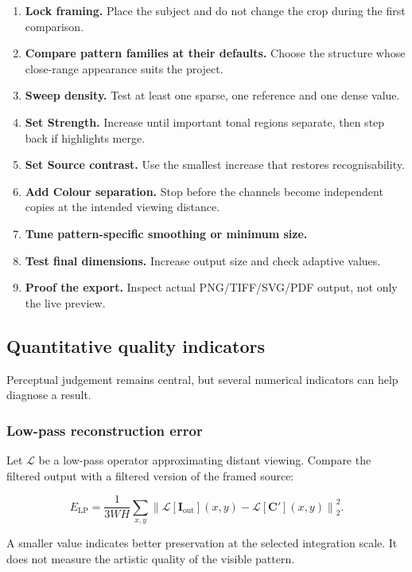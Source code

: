 \begin{enumerate}
  \item \textbf{Lock framing.} Place the subject and do not change the crop during the first comparison.
  \item \textbf{Compare pattern families at their defaults.} Choose the structure whose close-range appearance suits the project.
  \item \textbf{Sweep density.} Test at least one sparse, one reference and one dense value.
  \item \textbf{Set Strength.} Increase until important tonal regions separate, then step back if highlights merge.
  \item \textbf{Set Source contrast.} Use the smallest increase that restores recognisability.
  \item \textbf{Add Colour separation.} Stop before the channels become independent copies at the intended viewing distance.
  \item \textbf{Tune pattern-specific smoothing or minimum size.}
  \item \textbf{Test final dimensions.} Increase output size and check adaptive values.
  \item \textbf{Proof the export.} Inspect actual PNG/TIFF/SVG/PDF output, not only the live preview.
\end{enumerate}

\subsection{Quantitative quality indicators}

Perceptual judgement remains central, but several numerical indicators can help diagnose a result.

\subsubsection{Low-pass reconstruction error}

Let $\mathcal{L}$ be a low-pass operator approximating distant viewing. Compare the filtered output with a filtered version of the framed source:

\begin{equation}
E_{\mathrm{LP}}=
\frac{1}{3WH}
\sum_{x,y}
\left\|
\mathcal{L}[\mathbf{I}_{\mathrm{out}}](x,y)
-
\mathcal{L}[\mathbf{C}'](x,y)
\right\|_2^2.
\label{eq:lperror}
\end{equation}

A smaller value indicates better preservation at the selected integration scale. It does not measure the artistic quality of the visible pattern.

